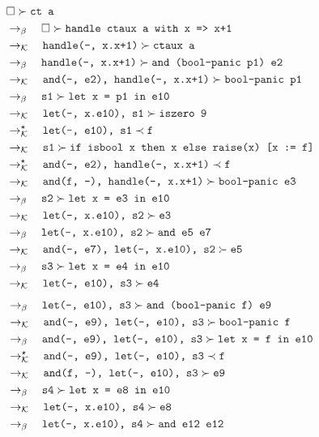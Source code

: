 \documentclass{article}
\newcommand{\tx}[1]{\textcolor{Black} {\texttt{#1}}}
\newcommand{\es}{$\square$}
\newcommand{\pop}[2]{ \tx{#1} \succ \tx{#2}}
\newcommand{\push}[2]{ \tx{#1} \prec \tx{#2}}
\newcommand{\kr}{\rightarrow_{\mathcal{K}} \quad}
\newcommand{\br}{\rightarrow_{\beta} \quad}
\newcommand{\krs}{\rightarrow_{\mathcal{K}}^{\star} \quad}
\begin{document}
\begin{enumerate}
        \begin{align*}
        &\pop{\es}{ct a}\\
        &\br \pop{\es}{handle ctaux a with x => x+1}\\
        &\kr \pop{handle(-, x.x+1)}{ctaux a}\\
        &\br \pop{handle(-, x.x+1)}{and (bool-panic p1) e2}\\
        &\kr \pop{and(-, e2), handle(-, x.x+1)}{bool-panic p1}\\
        &\br \pop{s1}{let x = p1 in e10}\\
        &\kr \pop{let(-, x.e10), s1}{iszero 9}\\
        &\krs \push{let(-, e10), s1}{f}\\
        &\kr \pop{s1}{if isbool x then x else raise(x) [x := f]}\\
        &\krs \push{and(-, e2), handle(-, x.x+1)}{f}\\
        &\kr \pop{and(f, -), handle(-, x.x+1)}{bool-panic e3}\\
        &\br \pop{s2}{let x = e3 in e10}\\
        &\kr \pop{let(-, x.e10), s2}{e3}\\
        &\br \pop{let(-, x.e10), s2}{and e5 e7}\\
        &\kr \pop{and(-, e7), let(-, x.e10), s2}{e5}\\
        &\br \pop{s3}{let x = e4 in e10}\\
        &\kr \pop{let(-, e10), s3}{e4}\\
        \end{align*}
        \begin{align*}
        &\br \pop{let(-, e10), s3}{and (bool-panic f) e9}\\
        &\kr \pop{and(-, e9), let(-, e10), s3}{bool-panic f}\\
        &\br \pop{and(-, e9), let(-, e10), s3}{let x = f in e10}\\
        &\krs \push{and(-, e9), let(-, e10), s3}{f}\\
        &\kr \pop{and(f, -), let(-, e10), s3}{e9}\\
        &\br \pop{s4}{let x = e8 in e10}\\
        &\kr \pop{let(-, x.e10), s4}{e8}\\
        &\br \pop{let(-, x.e10), s4}{and e12 e12}\\

\end{align*}
\end{enumerate}
\end{document}
